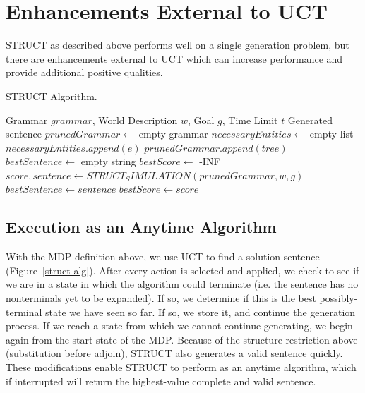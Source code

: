 \section{Enhancements External to UCT}

STRUCT as described above performs well on a single generation problem,
but there are enhancements
external to UCT which can increase performance and provide additional
positive qualities.

\begin{algorithm}
\caption{STRUCT Algorithm.} \label{struct-alg}
\begin{algorithmic}[1]
\REQUIRE Grammar $grammar$, World Description $w$, Goal $g$, Time Limit $t$
\ENSURE Generated sentence
\STATE $prunedGrammar \gets$ empty grammar
\STATE $necessaryEntities \gets$ empty list
		\STATE $necessaryEntities.append(e)$
	\ENDIF
\ENDFOR
{}
		\STATE $prunedGrammar.append(tree)$
	\ENDIF
\ENDFOR
\STATE $bestSentence \gets$ empty string
\STATE $bestScore \gets$ -INF
	\STATE $score, sentence \gets STRUCT_SIMULATION(prunedGrammar, w, g)$
		\STATE $bestSentence \gets sentence$
		\STATE $bestScore \gets score$
	\ENDIF
\ENDWHILE
\end{algorithmic}
\end{algorithm}

\subsection{Execution as an Anytime Algorithm}
 With the MDP definition above, we use UCT to find a solution sentence
 (Figure~\ref{struct-alg}). After every action is
 selected and applied, we check to see if we are in a state in which
 the algorithm could terminate (i.e. the sentence has no nonterminals
 yet to be expanded).  If so, we determine if this is the best
 possibly-terminal state we have seen so far.  If so, we store it, and
 continue the generation process. If we reach a state from which we
 cannot continue generating, we begin again from the start state of
 the MDP. Because of the structure restriction above (substitution
 before adjoin), STRUCT also generates a valid sentence quickly. These
 modifications enable STRUCT to perform as an anytime algorithm, which
 if interrupted will return the highest-value complete and valid
 sentence.

